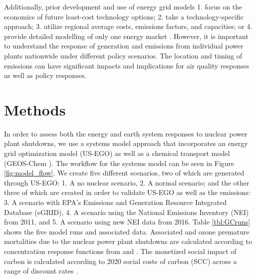 \documentclass[journal=jacsat,manuscript=article]{achemso}
\begin{document}
Additionally, prior development and use of energy grid models 1. focus on the economics of future least-cost technology options; 2. take a technology-specific approach; 3. utilize regional average costs, emissions factors, and capacities; or 4. provide detailed modelling of only one energy market \citep{jenkins_enhanced_2017, epa_ipm_2018}. However, it is important to understand the response of generation and emissions from individual power plants nationwide under different policy scenarios. The location and timing of emissions can have significant impacts and implications for air quality responses as well as policy responses. 


\section{Methods}
In order to assess both the energy and earth system responses to nuclear power plant shutdowns, we use a systems model approach that incorporates an energy grid optimization model (US-EGO) as well as a chemical transport model (GEOS-Chem \citep{bey_global_2001}). The workflow for the systems model can be seen in Figure \ref{fig:model_flow}. We create five different scenarios, two of which are generated through US-EGO: 1. A no nuclear scenario, 2. A normal scenario; and the other three of which are created in order to validate US-EGO as well as the emissions: 3. A scenario with EPA's Emissions and Generation Resource Integrated Database (eGRID), 4. A scenario using the National Emissions Inventory (NEI) from 2011, and 5. A scenario using new NEI data from 2016. Table \ref{tbl:GCruns} shows the five model runs and associated data. Associated  and ozone premature mortalities due to the nuclear power plant shutdowns are calculated according to concentration response functions from \cite{vodonos_concentration-response_2018} and \cite{atkinson_long-term_2016}. The monetized social impact of carbon is calculated according to 2020 social costs of carbon (SCC) across a range of discount rates \citep{interagency_working_group_on_social_cost_of_greenhouse_gases_united_states_government_technical_2021}.
\end{document}
